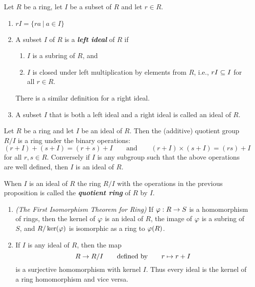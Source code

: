 \nl

\begin{defn}
Let $R$ be a ring, let $I$ be a subset of $R$ and let $r\in R$.
\begin{enumerate}
\item $rI = \{ra\ |\ a\in I\}$
\item A subset $I$ of $R$ is a \textit{\textbf{left ideal}} of $R$ if 
\begin{enumerate}
\item $I$ is a subring of $R$, and
\item $I$ is closed under left multiplication by elements from $R$, i.e., $rI\subseteq I$ for all $r\in R$.
\end{enumerate}
There is a similar definition for a right ideal.
\item A subset $I$ that is both a left ideal and a right ideal is called an ideal of $R$.
\end{enumerate}
\end{defn}

\nl

\begin{prop}
Let $R$ be a ring and let $I$ be an ideal of $R$. Then the (additive) quotient group $R/I$ is a ring under the binary operations:
\[(r+I)+(s+I) = (r+s)+I\qquad\text{and}\qquad(r+I)\times(s+I)=(rs)+I\]
for all $r,s\in R$. Conversely if $I$ is any subgroup such that the above operations are well defined, then $I$ is an ideal of $R$.
\end{prop}

\nl

\begin{defn}
When $I$ is an ideal of $R$ the ring $R/I$ with the operations in the previous proposition is called the \textit{\textbf{quotient ring}} of $R$ by $I$.
\end{defn}

\nl

\begin{thm}\nl
\begin{enumerate}
\item \textit{(The First Isomorphism Theorem for Ring)} If $\varphi:R\rightarrow S$ is a homomorphism of rings, then the kernel of $\varphi$ is an ideal of $R$, the image of $\varphi$ is a subring of $S$, and $R/\ker(\varphi)$ is isomorphic as a ring to $\varphi(R)$.
\item If $I$ is any ideal of $R$, then the map 
\[R\rightarrow R/I\qquad\text{defined by}\qquad r\mapsto r+I\]
is a surjective homomorphism with kernel $I$. Thus every ideal is the kernel of a ring homomorphism and vice versa.
\end{enumerate}
\end{thm}

